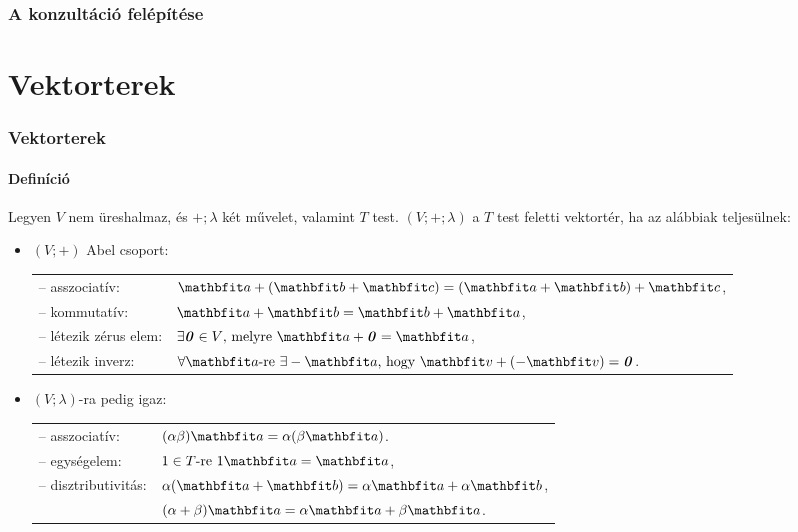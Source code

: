 \documentclass[xcolor={table}]{beamer}
\institute{Mechatronika szakosztály}
\begin{document}
\frame{\titlepage}

\begin{frame}
  \frametitle{A konzultáció felépítése}
  \tableofcontents
\end{frame}

\section{Vektorterek}
\begin{frame}
  \frametitle{Vektorterek}
  \framesubtitle{Definíció}

  Legyen $V$ nem üreshalmaz, és $+; \lambda$ két művelet, valamint $T$ test.
  $(V; +; \lambda)$ a $T$ test feletti vektortér, ha az alábbiak teljesülnek:
  \begin{itemize}
    \def\arraystretch{1.2}
    \item $(V; +)$ Abel csoport:\\[1mm]
          \begin{tabular}{p{35mm} l}
            -- asszociatív:        &
            $\rvec a + (\rvec b + \rvec c) = (\rvec a + \rvec b) + \rvec c$,
            \\
            -- kommutatív:         &
            $\rvec a + \rvec b = \rvec b + \rvec a$,
            \\
            -- létezik zérus elem: &
            $\exists \nvec \in V \text{, melyre } \rvec a + \nvec = \rvec a$,
            \\
            -- létezik inverz:     &
            $\forall \rvec a \text{-re } \exists - \rvec a \text{, hogy } \rvec v + (- \rvec v) = \nvec$.
          \end{tabular}
    \item $(V; \lambda)$-ra pedig igaz:\\[1mm]
          \begin{tabular}{p{35mm} l}
            -- asszociatív:      & $(\alpha \beta) \rvec a = \alpha (\beta \rvec a)$.
            \\
            -- egységelem:       & $1 \in T \text{-re } 1\rvec a = \rvec a$,
            \\
            -- disztributivitás: & $\alpha(\rvec a + \rvec b) = \alpha \rvec a + \alpha \rvec b$,
            \\
                                 & $(\alpha + \beta) \rvec a = \alpha \rvec a + \beta \rvec a$.
          \end{tabular}
  \end{itemize}
\end{frame}
\end{document}
